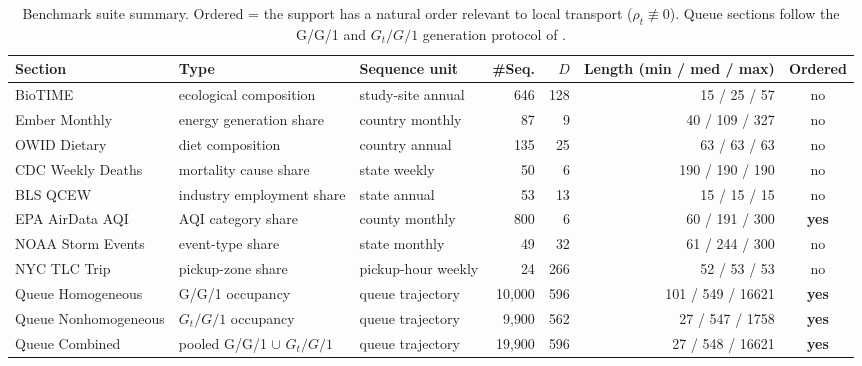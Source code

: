 \begin{table}[t]
\centering
\caption{Benchmark suite summary. Ordered = the support has a natural order relevant to local transport ($\rho_t\not\equiv 0$). Queue sections follow the G/G/1 and $G_t/G/1$ generation protocol of \citet{di2025transformerqueue}.}
\label{tab:main-dataset-summary-short}
\scriptsize
\setlength{\tabcolsep}{3.0pt}
\begin{tabular}{@{}lllrrrc@{}}
\toprule
Section & Type & Sequence unit & \#Seq. & $D$ & Length (min / med / max) & Ordered \\
\midrule
BioTIME & ecological composition & study-site annual & 646 & 128 & 15 / 25 / 57 & no \\
Ember Monthly & energy generation share & country monthly & 87 & 9 & 40 / 109 / 327 & no \\
OWID Dietary & diet composition & country annual & 135 & 25 & 63 / 63 / 63 & no \\
CDC Weekly Deaths & mortality cause share & state weekly & 50 & 6 & 190 / 190 / 190 & no \\
BLS QCEW & industry employment share & state annual & 53 & 13 & 15 / 15 / 15 & no \\
EPA AirData AQI & AQI category share & county monthly & 800 & 6 & 60 / 191 / 300 & \textbf{yes} \\
NOAA Storm Events & event-type share & state monthly & 49 & 32 & 61 / 244 / 300 & no \\
NYC TLC Trip & pickup-zone share & pickup-hour weekly & 24 & 266 & 52 / 53 / 53 & no \\
Queue Homogeneous & G/G/1 occupancy & queue trajectory & 10{,}000 & 596 & 101 / 549 / 16621 & \textbf{yes} \\
Queue Nonhomogeneous & $G_t/G/1$ occupancy & queue trajectory & 9{,}900 & 562 & 27 / 547 / 1758 & \textbf{yes} \\
Queue Combined & pooled G/G/1 $\cup$ $G_t/G/1$ & queue trajectory & 19{,}900 & 596 & 27 / 548 / 16621 & \textbf{yes} \\
\bottomrule
\end{tabular}
\end{table}
